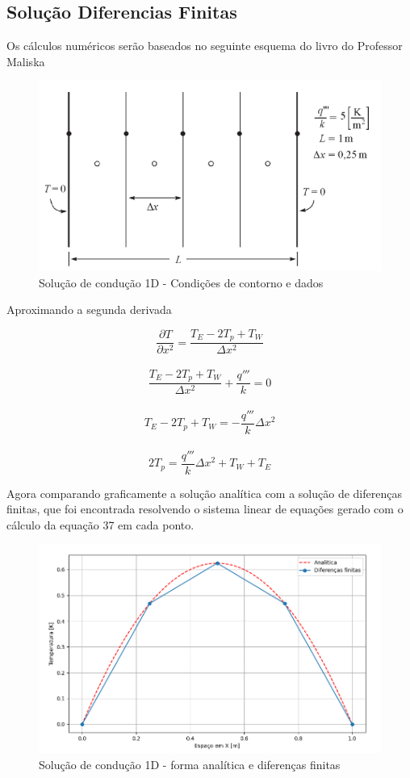 \documentclass[]{article}
\begin{document}
\subsection*{Solução Diferencias Finitas}

Os cálculos numéricos serão baseados no seguinte esquema do livro do Professor Maliska

\begin{figure}[h]
	\centering
	\includegraphics[width=.65\textwidth]{figures/38-1}
	\caption{Solução de condução 1D - Condições de contorno e dados}
\end{figure}

Aproximando a segunda derivada

\begin{equation}
	\frac{\partial T}{\partial x^{2}} = \frac{T_E - 2T_p +T_W}{\Delta x^{2}}
\end{equation}\\
\begin{equation}
	\frac{T_E - 2T_p +T_W}{\Delta x^{2}} + \frac{q'''}{k} = 0
\end{equation}\\

\begin{equation}
	T_E - 2T_p +T_W = - \frac{q'''}{k}\Delta x^{2}
\end{equation} \\

\begin{equation}
	2T_p = \frac{q'''}{k}\Delta x^{2} +T_W +T_E
\end{equation}

Agora comparando graficamente a solução analítica com a solução de diferenças finitas, que foi encontrada resolvendo o sistema linear de equações gerado com o cálculo da equação 37 em cada ponto.

\begin{figure}[H]
	\centering
	\includegraphics[width=.65\textwidth]{figures/38-2}
	\caption{Solução de condução 1D - forma analítica e diferenças finitas}
\end{figure}
\end{document}
